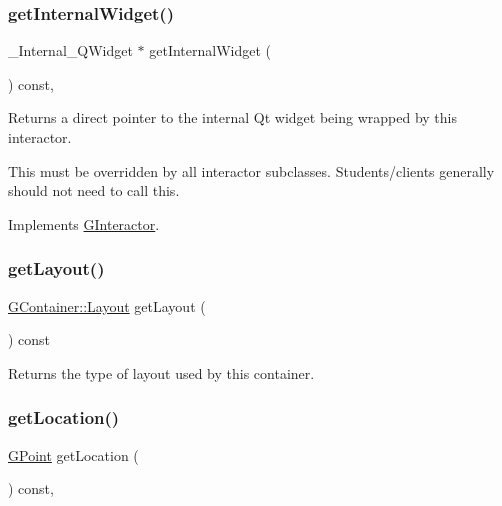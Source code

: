 \mbox{\label{classGContainer_a2f6b36b2517087dc90a366b5ce1f5323}} 
\subsubsection{\texorpdfstring{get\+Internal\+Widget()}{getInternalWidget()}}
{\footnotesize\ttfamily \+\_\+\+Internal\+\_\+\+Q\+Widget $\ast$ get\+Internal\+Widget (\begin{DoxyParamCaption}{ }\end{DoxyParamCaption}) const\hspace{0.3cm}{\ttfamily [override]}, {\ttfamily [virtual]}}



Returns a direct pointer to the internal Qt widget being wrapped by this interactor. 

This must be overridden by all interactor subclasses. Students/clients generally should not need to call this. 

Implements \mbox{\hyperlink{classGInteractor}{G\+Interactor}}.

\mbox{\label{classGContainer_aeebcf77b7fdc91a1ba0371cc9b91d5e2}} 
\subsubsection{\texorpdfstring{get\+Layout()}{getLayout()}}
{\footnotesize\ttfamily \mbox{\hyperlink{classGContainer_a1b7da28ed84c0763e8f92cde2df4799b}{G\+Container\+::\+Layout}} get\+Layout (\begin{DoxyParamCaption}{ }\end{DoxyParamCaption}) const\hspace{0.3cm}{\ttfamily [virtual]}}



Returns the type of layout used by this container. 

\mbox{\label{classGInteractor_a4f83802015511edeb63b892830812c11}} 
\subsubsection{\texorpdfstring{get\+Location()}{getLocation()}}
{\footnotesize\ttfamily \mbox{\hyperlink{structGPoint}{G\+Point}} get\+Location (\begin{DoxyParamCaption}{ }\end{DoxyParamCaption}) const\hspace{0.3cm}{\ttfamily [virtual]}, {\ttfamily [inherited]}}



